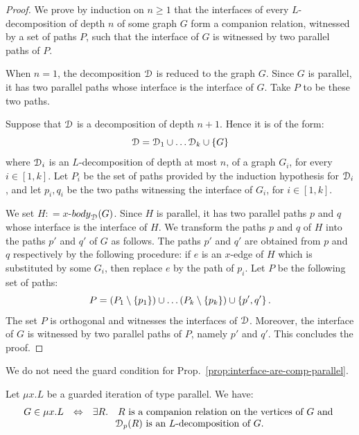 \begin{proof}
We prove by induction on $n\geq 1$ that the interfaces of every $L$-decomposition  of depth $n$ of some graph $G$ form a companion relation, witnessed by a set of paths $P$, such that the interface of $G$ is witnessed by two parallel paths of $P$. 
\medskip

 When $n=1$, the decomposition $\mathcal D$ is reduced to the graph $G$. Since $G$ is parallel, it has two parallel paths whose interface is the interface of $G$. Take $P$ to be these two paths. 
\medskip

Suppose that $\mathcal D$ is a decomposition of depth $n+1$. Hence it is of the form: 
$$\mathcal D=\mathcal D_1\cup\dots\mathcal D_k\cup\left\{G\right\}$$ 
where $\mathcal D_i$ is an $L$-decomposition of depth at most $n$, of a graph $G_i$, for every $i\in[1,k]$. Let $P_i$ be the set of paths provided by the induction hypothesis for $\mathcal D_i$, and let $p_i, q_i$ be the two paths witnessing the interface of $G_i$, for $i\in[1,k]$.
\medskip

We set $H: = x$-$\mathsf{body}_\cD(G)$.  Since $H$ is parallel, it has two parallel paths $p$ and $q$ whose interface is the interface of $H$. We transform the paths $p$ and $q$ of $H$ into the paths $p'$ and $q'$ of $G$ as follows. The paths $p'$ and $q'$ are obtained from $p$ and $q$ respectively by the following procedure: if $e$ is an $x$-edge of $H$ which is substituted by some $G_i$, then replace $e$ by the path of $p_i$. Let $P$ be the following set of paths: $$P=(P_1\setminus\left\{p_1\right\})\cup\dots (P_k\setminus\left\{p_k\right\}) \cup\left\{p',q'\right\}.$$
 The set $P$ is orthogonal and witnesses the interfaces of $\mathcal D$. Moreover, the interface of $G$ is witnessed by two parallel paths of $P$, namely $p'$ and $q'$. This concludes the proof.
\end{proof}
\begin{remark}
We do not need the guard condition for Prop.~\ref{prop:interface-are-comp-parallel}.
\end{remark}

\begin{corollary}\label{cor:decomp-iteration-parallel}
Let  $\mu x. L$ be a guarded iteration of type parallel. We have:
$$\begin{array}{rll}
  G\in \mu x. L& \Leftrightarrow& \exists R.\quad  R \text{ is a companion relation on the vertices of $G$ and }\\
                      &             & \quad\quad\   \cD_\mathsf{p}(R) \text{ is an $L$-decomposition of $G$.} 
\end{array}
$$
\end{corollary}

